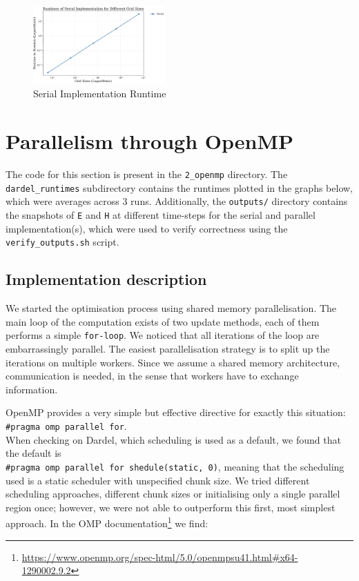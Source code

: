 \documentclass[a4paper,10pt]{article}
\begin{document}
\begin{multicols}{2}
\begin{figure}[H]
  \centering
  \includegraphics[width=0.45\textwidth]{../images/1_serial/serial_runtime.png}
  \caption{Serial Implementation Runtime}
  \label{fig:1_serial_runtime}
\end{figure}

\section{Parallelism through OpenMP}
\label{sec:omp}

The code for this section is present in the \verb|2_openmp| directory.
The \verb|dardel_runtimes| subdirectory contains the runtimes plotted in the graphs below, which were averages across 3 runs.
Additionally, the \verb|outputs/| directory contains the snapshots of \verb|E| and \verb|H| at different time-steps for the serial and parallel implementation(s), which were used to verify correctness using the \verb|verify_outputs.sh| script.

\subsection{Implementation description}
\label{sec:omp:implementation}
We started the optimisation process using shared memory parallelisation.
The main loop of the computation exists of two update methods, each of them performs a simple \verb|for-loop|.
We noticed that all iterations of the loop are embarrassingly parallel.
The easiest parallelisation strategy is to split up the iterations on multiple workers.
Since we assume a shared memory architecture, communication is needed, in the sense that workers have to exchange information.

OpenMP provides a very simple but effective directive for exactly this situation: \verb|#pragma omp parallel for|.\\
When checking on Dardel, which scheduling is used as a default, we found that the default is\\
\verb|#pragma omp parallel for shedule(static, 0)|, meaning that the scheduling used is a static scheduler with unspecified chunk size.
We tried different scheduling approaches, different chunk sizes or initialising only a single parallel region once; however, we were not able to outperform this first, most simplest approach.
In the OMP documentation\footnote{\url{https://www.openmp.org/spec-html/5.0/openmpsu41.html\#x64-1290002.9.2}} we find:


\end{multicols}
\end{document}
